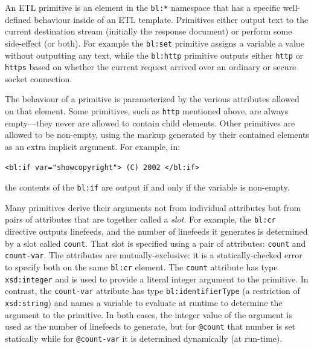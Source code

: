 \documentclass{www2003-submission}
\newcommand{\smtexttt}[1]{{\small\texttt{#1}}}
\newcommand{\ns}[1]{{\small\texttt{#1:*}}}
\begin{document}
An ETL primitive is an element in the \ns{bl} namespace that has a
specific well-defined behaviour inside of an ETL template.  Primitives
either output text to the current destination stream (initially the
response document) or perform some side-effect (or both).  For example
the \smtexttt{bl:set} primitive assigns a variable a value without
outputting any text, while the
\smtexttt{bl:http} primitive outputs either \smtexttt{http} or
\smtexttt{https} based on whether the current request arrived over an
ordinary or secure socket connection.

The behaviour of a primitive is parameterized by the various
attributes allowed on that element.  Some primitives, such as
\smtexttt{http} mentioned above, are always empty---they never are
allowed to contain child elements. 
Other primitives are allowed to be non-empty, using the markup generated
by their contained elements as an extra implicit argument.  For example,
in:

\smtexttt{<bl:if var="showcopyright"> (C) 2002 </bl:if>}

\noindent the contents of the \smtexttt{bl:if} are output if and
only if the variable is non-empty.

Many primitives derive their arguments not from individual attributes
but from pairs of attributes that are together called a \emph{slot}.  For
example, the \smtexttt{bl:cr} directive outputs linefeeds, and the
number of linefeeds it generates is determined by a slot called
\smtexttt{count}.  That slot is specified using a pair of attributes:
\smtexttt{count} and \smtexttt{count-var}.  The attributes are
mutually-exclusive: it is a statically-checked error to specify both on
the same \smtexttt{bl:cr} element.  The \smtexttt{count} attribute has
type \smtexttt{xsd:integer} and is used to provide a literal integer
argument to the primitive.  In contrast, the \smtexttt{count-var}
attribute has type \smtexttt{bl:identifierType} (a restriction of
\smtexttt{xsd:string}) and names a variable to evaluate at runtime to
determine the argument to the primitive.  In both cases, the integer
value of the argument is used as the number of linefeeds to generate,
but for \smtexttt{@count} that number is set statically while for
\smtexttt{@count-var} it is determined dynamically (at run-time).
\end{document}
